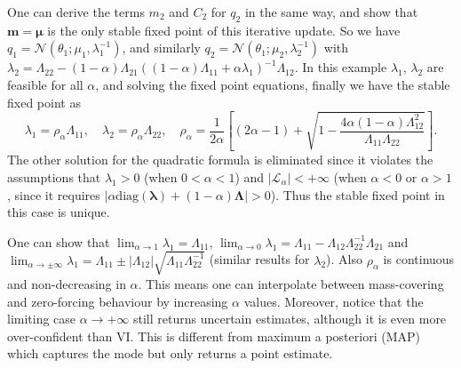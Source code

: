 One can derive the terms $m_2$ and $C_2$ for $q_2$ in the same way, and show that $\bm{m} = \bm{\mu}$ is the only stable fixed point of this iterative update. So we have $q_1 = \mathcal{N}(\theta_1; \mu_1, \lambda_1^{-1})$, and similarly $q_2 = \mathcal{N}(\theta_1; \mu_2, \lambda_2^{-1})$ with $\lambda_2 = \Lambda_{22} - (1 - \alpha) \Lambda_{21} ((1 - \alpha) \Lambda_{11} + \alpha \lambda_1)^{-1} \Lambda_{12}$. In this example $\lambda_1$, $\lambda_2$ are feasible for all $\alpha$, and solving the fixed point equations, finally we have the stable fixed point as
\begin{equation*}
\lambda_1 = \rho_{\alpha} \Lambda_{11}, \quad \lambda_2 = \rho_{\alpha} \Lambda_{22}, \quad 
\rho_{\alpha} = \frac{1}{2 \alpha} \left[ (2\alpha - 1) + \sqrt{1 - \frac{4\alpha (1 - \alpha) \Lambda_{12}^2}{\Lambda_{11} \Lambda_{22}}} \right].
\end{equation*}
The other solution for the quadratic formula is eliminated since it violates the assumptions that $\lambda_1 > 0$ (when $0 < \alpha < 1$) and $|\mathcal{L}_{\alpha}| < +\infty$ (when $\alpha < 0$ or $\alpha > 1$, since it requires $|\alpha \text{diag}(\bm{\lambda}) + (1 - \alpha)\bm{\Lambda}| > 0$). Thus the stable fixed point in this case is unique.

One can show that $\lim_{\alpha \rightarrow 1} \lambda_1 = \Lambda_{11}$, $\lim_{\alpha \rightarrow 0} \lambda_1 = \Lambda_{11} - \Lambda_{12} \Lambda_{22}^{-1} \Lambda_{21}$ and $\lim_{\alpha \rightarrow \pm \infty} \lambda_1 = \Lambda_{11} \pm |\Lambda_{12}| \sqrt{\Lambda_{11} \Lambda_{22}^{-1}}$ (similar results for $\lambda_2$). Also $\rho_{\alpha}$ is continuous and non-decreasing in $\alpha$. This means one can interpolate between mass-covering and zero-forcing behaviour by increasing $\alpha$ values. Moreover, notice that the limiting case $\alpha \rightarrow +\infty$ still returns uncertain estimates, although it is even more over-confident than VI. This is different from maximum a posteriori (MAP) which captures the mode but only returns a point estimate.
